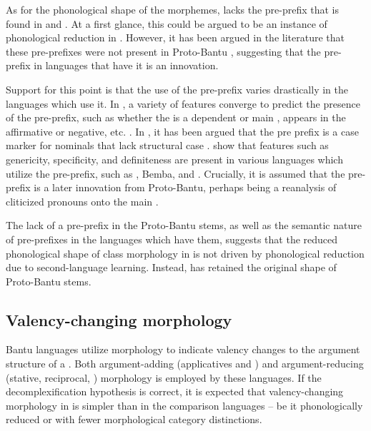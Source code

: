 \documentclass[output=paper,
modfonts
]{langscibook}
\begin{document}
As for the phonological shape of the morphemes,  lacks the pre-prefix that is found in  and . At a first glance, this could be argued to be an instance of phonological reduction in . However, it has been argued in the literature that these pre-prefixes were not present in Proto-Bantu \citep{Katamba2003}, suggesting that the pre-prefix in languages that have it is an innovation. 

Support for this point is that the use of the pre-prefix varies drastically in the languages which use it. In , a variety of features converge to predict the presence of the pre-prefix, such as whether the  is a dependent or main , appears in the affirmative or negative, etc. \citep{Hyman1991,Hyman1993}. In , it has been argued that the pre prefix is a case marker for nominals that lack structural case \citep{Halpert2012}.  \citet{ZerbianKrifka2008} show that features such as genericity, specificity, and definiteness are present in various languages which utilize the pre-prefix, such as , Bemba, and . Crucially, it is assumed that the pre-prefix is a later innovation from Proto-Bantu, perhaps being a reanalysis of cliticized pronouns onto the main  \citep{Bleek1869}. 
		 
	The lack of a pre-prefix in the Proto-Bantu stems, as well as the semantic nature of pre-prefixes in the languages which have them, suggests that the reduced phonological shape of class morphology in  is not driven by phonological reduction due to second-language learning. Instead,  has retained the original shape of Proto-Bantu stems. 
	  
	 
	

  


 

 \subsection{Valency-changing morphology}%
 
  
Bantu languages utilize morphology to indicate valency changes to the argument structure of a .  Both argument-adding (applicatives and ) and argument-redu\-cing (stative, reciprocal, ) morphology is employed by these languages. If the decomplexification hypothesis is correct, it is expected that valency-changing morphology in  is simpler than in the comparison languages -- be it phonologically reduced or with fewer morphological category distinctions. 
\end{document}
